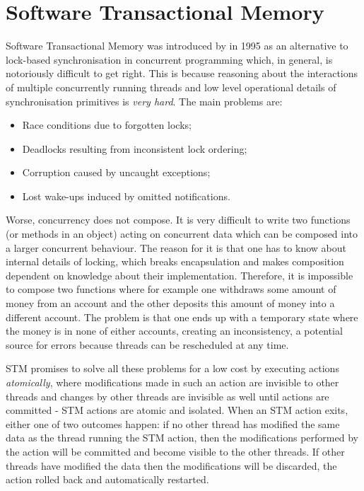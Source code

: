 \section{Software Transactional Memory}
Software Transactional Memory was introduced by \cite{shavit_software_1995} in 1995 as an alternative to lock-based synchronisation in concurrent programming which, in general, is notoriously difficult to get right. This is because reasoning about the interactions of multiple concurrently running threads and low level operational details of synchronisation primitives is \textit{very hard}. The main problems are:

\begin{itemize}
	\item Race conditions due to forgotten locks;
	\item Deadlocks resulting from inconsistent lock ordering;
	\item Corruption caused by uncaught exceptions;
	\item Lost wake-ups induced by omitted notifications.
\end{itemize}

Worse, concurrency does not compose. It is very difficult to write two functions (or methods in an object) acting on concurrent data which can be composed into a larger concurrent behaviour. The reason for it is that one has to know about internal details of locking, which breaks encapsulation and makes composition dependent on knowledge about their implementation. Therefore, it is impossible to compose two functions where for example one withdraws some amount of money from an account and the other deposits this amount of money into a different account. The problem is that one ends up with a temporary state where the money is in none of either accounts, creating an inconsistency, a potential source for errors because threads can be rescheduled at any time.

STM promises to solve all these problems for a low cost by executing actions \textit{atomically}, where modifications made in such an action are invisible to other threads and changes by other threads are invisible as well until actions are committed - STM actions are atomic and isolated. When an STM action exits, either one of two outcomes happen: if no other thread has modified the same data as the thread running the STM action, then the modifications performed by the action will be committed and become visible to the other threads. If other threads have modified the data then the modifications will be discarded, the action rolled back and automatically restarted.

